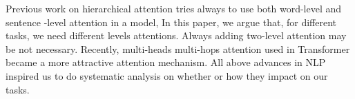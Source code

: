 Previous work on hierarchical attention\cite{yang2016hierarchical}
tries always to use both word-level and sentence -level attention in a
model, In this paper, we argue that, for different tasks, we need
different levels attentions. Always adding two-level attention may be
not necessary.  Recently, multi-heads multi-hops attention used in
Transformer \cite{NIPS2017_7181} became a more attractive attention
mechanism. All above advances in NLP inspired us to do systematic
analysis on whether or how they impact on our tasks.


